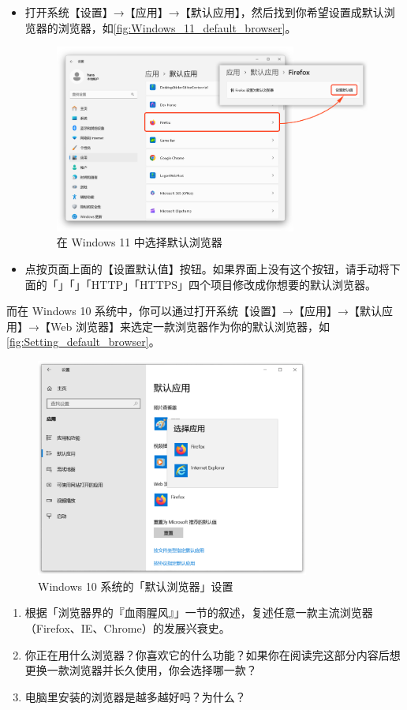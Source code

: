 \begin{itemize}
  \item 打开系统【设置】→【应用】→【默认应用】，然后找到你希望设置成默认浏览器的浏览器，如\autoref{fig:Windows_11_default_browser}。
    \begin{figure}[htb!]
      \centering
      \includegraphics[width=.8\textwidth]{assets/software/Windows_11_default_browser.png}
      \caption{在 Windows 11 中选择默认浏览器}
      \label{fig:Windows_11_default_browser}
    \end{figure}
  \item 点按页面上面的【设置默认值】按钮。如果界面上没有这个按钮，请手动将下面的「」「」\linebreak「HTTP」「HTTPS」四个项目修改成你想要的默认浏览器。
\end{itemize}

而在 Windows 10 系统中，你可以通过打开系统【设置】→【应用】→【默认应用】→【Web 浏览器】来选定一款浏览器作为你的默认浏览器，如\autoref{fig:Setting_default_browser}。

\begin{figure}[htb!]
  \centering
  \includegraphics[width=9cm]{assets/software/Setting_default_browser.png}
  \caption{Windows 10 系统的「默认浏览器」设置}
  \label{fig:Setting_default_browser}
\end{figure}

\practice

\begin{enumerate}
  \item 根据「浏览器界的『血雨腥风』」一节的叙述，复述任意一款主流浏览器（Firefox、IE、Chrome）的发展兴衰史。
  \item 你正在用什么浏览器？你喜欢它的什么功能？如果你在阅读完这部分内容后想更换一款浏览器并长久使用，你会选择哪一款？
  \item 电脑里安装的浏览器是越多越好吗？为什么？
\end{enumerate}